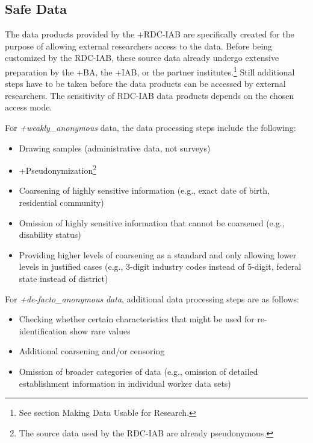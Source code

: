 \documentclass[
]{book}
\providecommand{\tightlist}{%
  \setlength{\itemsep}{0pt}\setlength{\parskip}{0pt}}
\begin{document}
\hypertarget{safe-data}{%
\subsection{Safe Data}\label{safe-data}}

The data products provided by the +RDC-IAB\textbar{} are specifically created for the purpose of allowing external researchers access to the data. Before being customized by the RDC-IAB, these source data already undergo extensive preparation by the +BA\textbar, the +IAB\textbar, or the partner institutes.\footnote{See section Making Data Usable for Research.} Still additional steps have to be taken before the data products can be accessed by external researchers. The sensitivity of RDC-IAB data products depends on the chosen access mode.

For \emph{+weakly\_anonymous\textbar{}} data, the data processing steps include the following:

\begin{itemize}
\tightlist
\item
  Drawing samples (administrative data, not surveys)
\item
  +Pseudonymization\textbar{}\footnote{The source data used by the RDC-IAB are already pseudonymous.}
\item
  Coarsening of highly sensitive information (e.g., exact date of birth, residential community)
\item
  Omission of highly sensitive information that cannot be coarsened (e.g., disability status)
\item
  Providing higher levels of coarsening as a standard and only allowing lower levels in justified cases (e.g., 3-digit industry codes instead of 5-digit, federal state instead of district)
\end{itemize}

For \emph{+de-facto\_anonymous\textbar{}} \emph{data}, additional data processing steps are as follows:

\begin{itemize}
\tightlist
\item
  Checking whether certain characteristics that might be used for re-identification show rare values
\item
  Additional coarsening and/or censoring
\item
  Omission of broader categories of data (e.g., omission of detailed establishment information in individual worker data sets)
\end{itemize}
\end{document}
